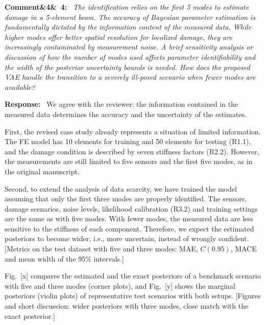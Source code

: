 \documentclass[11pt]{article}
\newenvironment{rcomment}[1]{\par\bigskip\noindent\textbf{Comment\ifx&#1&\else\ #1\fi:}\ \itshape}{\par}
\newenvironment{response}{\par\smallskip\noindent\color{resp}\textbf{Response:}\ }{\par}
\newcommand{\tbd}[1]{\textcolor{note}{\textsf{[#1]}}}
\begin{document}
\begin{rcomment}{4}
The identification relies on the first 5 modes to estimate damage in a 5-element beam. The accuracy of Bayesian
parameter estimation is fundamentally dictated by the information content of the measured data. While higher modes
offer better spatial resolution for localized damage, they are increasingly contaminated by measurement noise. A brief
sensitivity analysis or discussion of how the number of modes used affects parameter identifiability and the width of
the posterior uncertainty bounds is needed. How does the proposed VAE handle the transition to a severely ill-posed
scenario when fewer modes are available?
\end{rcomment}

\begin{response}
We agree with the reviewer: the information contained in the measured data determines the accuracy and the uncertainty of the estimates.

First, the revised case study already represents a situation of limited information.
The FE model has 10 elements for training and 50 elements for testing (R1.1), and the damage condition is described by seven stiffness factors (R2.2).
However, the measurements are still limited to five sensors and the first five modes, as in the original manuscript.

Second, to extend the analysis of data scarcity, we have trained the model assuming that only the first three modes are properly identified.
The sensors, damage scenarios, noise levels, likelihood calibration (R3.2) and training settings are the same as with five modes.
With fewer modes, the measured data are less sensitive to the stiffness of each component.
Therefore, we expect the estimated posteriors to become wider, i.e., more uncertain, instead of wrongly confident.
\tbd{Metrics on the test dataset with five and three modes: MAE, $C(0.95)$, MACE and mean width of the 95\% intervals.}

Fig.~\tbd{x} compares the estimated and the exact posteriors of a benchmark scenario with five and three modes (corner plots), and Fig.~\tbd{y} shows the marginal posteriors (violin plots) of representative test scenarios with both setups.
\tbd{Figures and short discussion: wider posteriors with three modes, close match with the exact posterior.}
\end{response}
\end{document}
